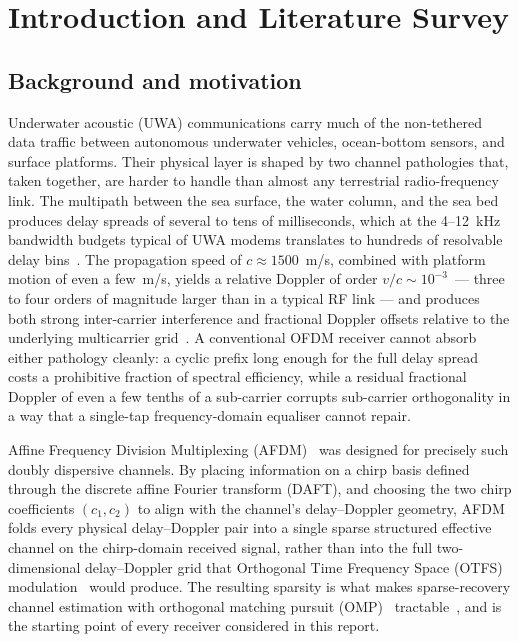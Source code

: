 \section{Introduction and Literature Survey}
\label{sec:intro}

\subsection{Background and motivation}
\label{ssec:motivation}

Underwater acoustic (UWA) communications carry much of the non-tethered data
traffic between autonomous underwater vehicles, ocean-bottom sensors, and surface
platforms. Their physical layer is shaped by two channel pathologies that, taken
together, are harder to handle than almost any terrestrial radio-frequency link.
The multipath between the sea surface, the water column, and the sea bed produces
delay spreads of several to tens of milliseconds, which at the 4--12~kHz bandwidth
budgets typical of UWA modems translates to hundreds of resolvable delay
bins~\cite{stojanovic2009uwa,preisig2007uwa}. The propagation speed of $c \approx
1500$~m/s, combined with platform motion of even a few~m/s, yields a relative
Doppler of order $v / c \sim 10^{-3}$~--- three to four orders of magnitude larger
than in a typical RF link --- and produces both strong inter-carrier interference
and fractional Doppler offsets relative to the underlying multicarrier
grid~\cite{berger2010uwasparse,huang2010uwamimoofdm}. A conventional OFDM receiver
cannot absorb either pathology cleanly: a cyclic prefix long enough for the full
delay spread costs a prohibitive fraction of spectral efficiency, while a residual
fractional Doppler of even a few tenths of a sub-carrier corrupts sub-carrier
orthogonality in a way that a single-tap frequency-domain equaliser cannot repair.

Affine Frequency Division Multiplexing (AFDM)~\cite{bemani2023afdm} was designed
for precisely such doubly dispersive channels. By placing information on a chirp
basis defined through the discrete affine Fourier transform (DAFT), and choosing
the two chirp coefficients $(c_1, c_2)$ to align with the channel's
delay--Doppler geometry, AFDM folds every physical delay--Doppler pair into a
single sparse structured effective channel on the chirp-domain received signal,
rather than into the full two-dimensional delay--Doppler grid that Orthogonal
Time Frequency Space (OTFS) modulation~\cite{hadani2017otfs,raviteja2018otfs,%
wei2021otfspromising} would produce. The resulting sparsity is what makes
sparse-recovery channel estimation with orthogonal matching pursuit
(OMP)~\cite{tropp2007signal} tractable~\cite{benzine2023sparseafdm,%
rou2024otfstoafdm}, and is the starting point of every receiver considered in
this report.


